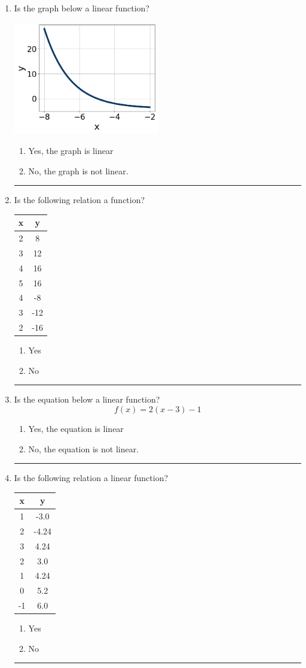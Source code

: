 \documentclass[14pt]{extbook}
\newcommand{\litem}[1]{\item#1\hspace*{-1cm}\rule{\textwidth}{0.4pt}}
\begin{document}
\begin{enumerate}
{\begin{enumerate}[label=\Alph*.]
\end{enumerate} }
\litem{
Is the graph below a linear function?
\begin{center}
    \includegraphics[width=0.5\textwidth]{../Figures/MA_8_F_1_2_graphJ.png}
\end{center}
\begin{enumerate}[label=\Alph*.]
\item Yes, the graph is linear
\item No, the graph is not linear.

\end{enumerate} }
\litem{
Is the following relation a function?

\begin{tabular}{c|c}
x &y\tabularnewline \hline
2 &8\tabularnewline \hline
3 &12\tabularnewline \hline
4 &16\tabularnewline \hline
5 &16\tabularnewline \hline
4 &-8\tabularnewline \hline
3 &-12\tabularnewline \hline
2 &-16\end{tabular}\begin{enumerate}[label=\Alph*.]
\item Yes
\item No

\end{enumerate} }
\litem{
Is the equation below a linear function?\[ f(x) = 2(x -3)-1 \]\begin{enumerate}[label=\Alph*.]
\item Yes, the equation is linear
\item No, the equation is not linear.

\end{enumerate} }
\litem{
Is the following relation a linear function?

\begin{tabular}{c|c}
x &y\tabularnewline \hline
1 &-3.0\tabularnewline \hline
2 &-4.24\tabularnewline \hline
3 &4.24\tabularnewline \hline
2 &3.0\tabularnewline \hline
1 &4.24\tabularnewline \hline
0 &5.2\tabularnewline \hline
-1 &6.0\end{tabular}\begin{enumerate}[label=\Alph*.]
\item Yes
\item No


\end{enumerate}}
\end{enumerate}
\end{document}
